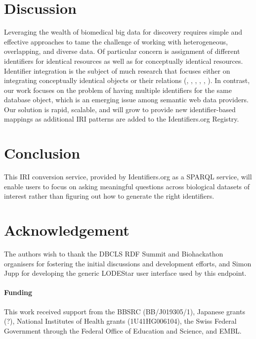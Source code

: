 \documentclass{bioinfo}
\begin{document}
\section{Discussion}
Leveraging the wealth of biomedical big data for discovery requires simple and effective approaches to tame the challenge of working with heterogeneous, overlapping, and diverse data. Of particular concern is assignment of different identifiers for identical resources as well as for conceptually identical resources. Identifier integration is the subject of much research that focuses either on integrating conceptually identical objects or their relations (\cite{Day2011}, \cite{VanIersel2010}, \cite{Wein2012}, \cite{Smith2007}, \cite{Chambers2013}, \cite{Huang2011}). In contrast, our work focuses on the problem of having multiple identifiers for the same database object, which is an emerging issue among semantic web data providers. Our solution is rapid, scalable, and will grow to provide new identifier-based mappings as additional IRI patterns are added to the Identifiers.org Registry. 

\section{Conclusion}
This IRI conversion service, provided by Identifiers.org as a SPARQL service, will enable users to focus on asking meaningful questions across biological datasets of interest rather than figuring out how to generate the right identifiers. 

\section*{Acknowledgement}
The authors wish to thank the DBCLS RDF Summit and Biohackathon organisers for fostering the initial discussions and development efforts, and Simon Jupp for developing the generic LODEStar user interface used by this endpoint.

\paragraph{Funding\textcolon} 
This work received support from the BBSRC (BB/J019305/1), Japanese grants (?), National Institutes of Health grants (1U41HG006104), the Swiss Federal Government through the Federal Office of Education and Science, and EMBL.  


%
%
%
%
%
%
%
%
  
\end{document}
